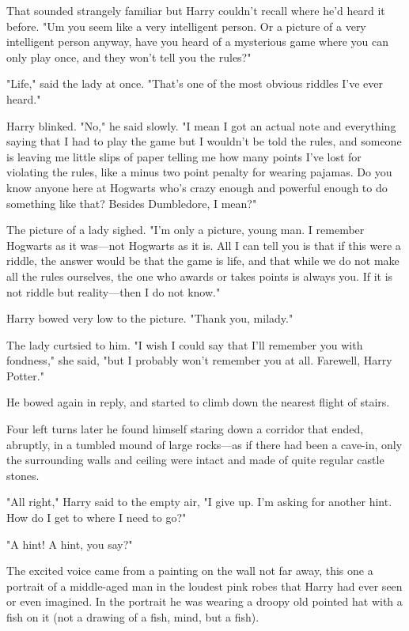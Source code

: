 That sounded strangely familiar but Harry couldn't recall where he'd heard it
before. "Um{\el} you seem like a very intelligent person. Or a picture of a
very intelligent person{\el} anyway, have you heard of a mysterious game
where you can only play once, and they won't tell you the rules?"

"Life," said the lady at once. "That's one of the most obvious riddles I've
ever heard."

Harry blinked. "No," he said slowly. "I mean I got an actual note and
everything saying that I had to play the game but I wouldn't be told the rules,
and someone is leaving me little slips of paper telling me how many points I've
lost for violating the rules, like a minus two point penalty for wearing
pajamas. Do you know anyone here at Hogwarts who's crazy enough and powerful
enough to do something like that? Besides Dumbledore, I mean?"

The picture of a lady sighed. "I'm only a picture, young man. I remember
Hogwarts as it was—not Hogwarts as it is. All I can tell you is that if this
were a riddle, the answer would be that the game is life, and that while we do
not make all the rules ourselves, the one who awards or takes points is always
you. If it is not riddle but reality—then I do not know."

Harry bowed very low to the picture. "Thank you, milady."

The lady curtsied to him. "I wish I could say that I'll remember you with
fondness," she said, "but I probably won't remember you at all. Farewell, Harry
Potter."

He bowed again in reply, and started to climb down the nearest flight of stairs.

Four left turns later he found himself staring down a corridor that ended,
abruptly, in a tumbled mound of large rocks—as if there had been a cave-in,
only the surrounding walls and ceiling were intact and made of quite regular
castle stones.

"All right," Harry said to the empty air, "I give up. I'm asking for another
hint. How do I get to where I need to go?"

"A hint! A hint, you say?"

The excited voice came from a painting on the wall not far away, this one a
portrait of a middle-aged man in the loudest pink robes that Harry had ever
seen or even imagined. In the portrait he was wearing a droopy old pointed hat
with a fish on it (not a drawing of a fish, mind, but a fish).

